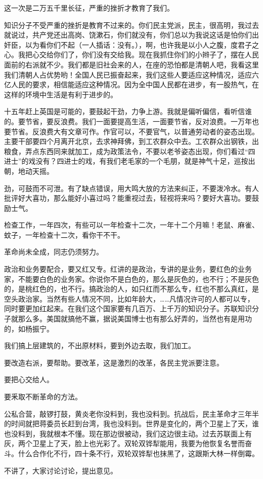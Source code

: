 这一次是二万五千里长征，严重的挫折才教育了我们。

知识分子不受严重的挫折是教育不过来的。你们民主党派，民主，很高明，我过去就说过，共产党还出高岗、饶漱石，你们就没有，你们总以为我说这话是怕你们出奸臣，以为看你们不起（一人插话：没有。），啊，也许我是以小人之腹，度君子之心。我把心交给你们了，你们没有交给我。现在我抓住你们的小辫子了，摆在人民面前的右派就不少。我们都是旧社会来的人，在座的恐怕都是清朝人吧，我看这里我们清朝人占优势哟！全国人民已振奋起来，我们这些人要适应这种情况，适应六亿人民的要求，相信能适应这种情况。因为全中国人民都在进步，有一股热气，在这样的环境中生活是有利于进步的。

十五年赶上英国是可能的，要鼓起干劲，力争上游。我就是偏听偏信，看听信谁的。要节省，要反浪费。我们一面要提高生活，一面要节省，反对浪费。一万年也要节省。反浪费大有文章可作。作官可以，不要官气，以普通劳动者的姿态出现。主要干部要四个月离开北京，去求神拜佛，到工农群众中去。工农群众出钢铁，出粮食，弄点东西同来就加工，成为政策法令，不要以老爷姿态出现，你们看过“四进士”的戏没有？四进士的戏，有我们老毛家的一个毛朋，就是神气十足，巡按出朝，地动天摇。

劲，可鼓而不可泄。有了缺点错误，用大鸣大放的方法来纠正，不要泼冷水。有人批评好大喜功，那么能好小喜过吗？能重视过去，轻视将来吗？要好大喜功。要鼓励士气。

检查工作，一年四次，有些可以一年检查十二次，一年十二个月嘛！老鼠、麻雀、蚊子，一年检查十二次，看你干不干。

革命尚未全成，同志仍须努力。

政治和业务要配合，要又红又专。红讲的是政治，专讲的是业务，要红色的业务家，不能要白色的业务家。你说你不是白色的，那么是灰色的，也不行；不是灰色的，是桃红色的，也不行。搞政治的人，如只红而不那么专，红也不那么真红，是空头政治家。当然有些人情况不同，比如年龄大，……凡情况许可的人都可以专，同时要更加红起来。在我们这个国家要有几百万、上千万的知识分子。苏联知识分子就那么多。美国就搞他不赢，据说美国博士也有那么好弄的，当然也有是用功的，如杨振宁。

我们搞上层建筑的，不出原材料，要到外边去取，我们加工。

要改造右派，要帮助。要改革，这是激烈的改革，各民主党派要注意。

要把心交给人。

要釆取不断革命的方法。

公私合营，敲锣打鼓，黄炎老你没料到，我也没料到。抗战后，民主革命才三年半的时间就把蒋委员长赶到台湾，我也没料到。世界是变化的，两个卫星上了天，谁也没料到，我就根本不懂。现在那边很被动，我们这边很主动。过去苏联面上有灰，两个卫星上了天，脸上也光彩了。双轮双铧犁能用，我要为他恢复名誉而奋斗。什么合作化不行，四十条不行，双轮双铧犁也抹黑了，这跟斯大林一样倒霉。

不讲了，大家讨论讨论，提出意见。


